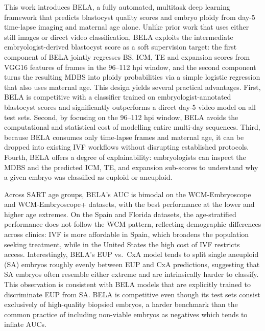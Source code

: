 \documentclass[11pt,a4paper]{article}
\begin{document}
This work introduces BELA, a fully automated, multitask deep learning
framework that predicts blastocyst quality scores and embryo ploidy from
day-5 time-lapse imaging and maternal age alone. Unlike prior work that
uses either still images or direct video classification, BELA exploits
the intermediate embryologist-derived blastocyst score as a soft
supervision target: the first component of BELA jointly regresses BS,
ICM, TE and expansion scores from VGG16 features of frames in the
96--112 hpi window, and the second component turns the resulting MDBS
into ploidy probabilities via a simple logistic regression that also
uses maternal age. This design yields several practical advantages.
First, BELA is competitive with a classifier trained on
embryologist-annotated blastocyst scores and significantly outperforms a
direct day-5 video model on all test sets. Second, by focusing on the
96--112 hpi window, BELA avoids the computational and statistical cost
of modelling entire multi-day sequences. Third, because BELA consumes
only time-lapse frames and maternal age, it can be dropped into existing
IVF workflows without disrupting established protocols. Fourth, BELA
offers a degree of explainability: embryologists can inspect the MDBS
and the predicted ICM, TE, and expansion sub-scores to understand why a
given embryo was classified as euploid or aneuploid.

Across SART age groups, BELA's AUC is bimodal on the WCM-Embryoscope and
WCM-Embryoscope+ datasets, with the best performance at the lower and
higher age extremes. On the Spain and Florida datasets, the
age-stratified performance does not follow the WCM pattern, reflecting
demographic differences across clinics: IVF is more affordable in Spain,
which broadens the population seeking treatment, while in the United
States the high cost of IVF restricts access. Interestingly, BELA's
EUP vs.\ CxA model tends to split single aneuploid (SA) embryos roughly
evenly between EUP and CxA predictions, suggesting that SA embryos often
resemble either extreme and are intrinsically harder to classify. This
observation is consistent with BELA models that are explicitly trained
to discriminate EUP from SA. BELA is competitive even though its test
sets consist exclusively of high-quality biopsied embryos, a harder
benchmark than the common practice of including non-viable embryos as
negatives which tends to inflate AUCs.
\end{document}
